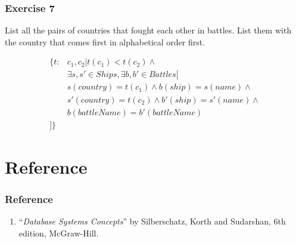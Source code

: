 \documentclass{beamer}
\begin{document}
\begin{frame}[fragile]
\frametitle{Exercise 7}
List all the pairs of countries that fought each other in battles. List them with the country that comes first in alphabetical order first\footnotemark {}.

\begin{align*}
\{t:&c_1, c_2| t(c_1)<t(c_2) \wedge \\ 
&\exists s, s'\in Ships, \exists b, b' \in Battles \Big[\\
& s(country)=t(c_1) \wedge b(ship) =s(name) \wedge \\
& s'(country)=t(c_2) \wedge b'(ship) =s'(name) \wedge \\
& b(battleName) = b'(battleName) \\
\Big]\}
\end{align*}
\end{frame}

\section{Reference}
\begin{frame}[fragile]
\frametitle{Reference}
\begin{enumerate}
\item ``\textit{Database Systems Concepts}'' by Silberschatz, Korth and Sudarshan, 6th edition, McGraw-Hill.
\end{enumerate}
\end{frame}
\end{document}
